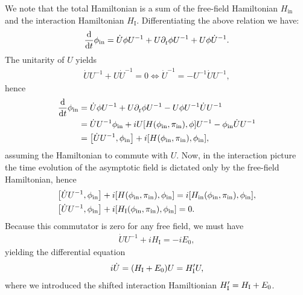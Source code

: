 We note that the total Hamiltonian is a sum of the free-field Hamiltonian $H_{\text{in}}$ and the interaction Hamiltonian $H_{\text{I}}$. Differentiating the above relation we have:
\begin{align*}
	\dv{t}\phi_{\text{in}} = \dot{U}\phi U^{-1} + U\partial^{}_{t}\phi U^{-1} + U\phi \dot{U}^{-1}.
\end{align*}
The unitarity of $U$ yields
\begin{align*}
	\dot{U}U^{-1} + U\dot{U}^{-1} = 0 \iff \dot{U}^{-1} = -U^{-1}\dot{U}U^{-1},
\end{align*}
hence
\begin{align*}
	\dv{t}\phi_{\text{in}} &= \dot{U}\phi U^{-1} + U\del{}{t}\phi U^{-1} - U\phi U^{-1}\dot{U}U^{-1} \\
	                       &= \dot{U}U^{-1}\phi_{\text{in}} + iU\comm{H(\phi_{\text{in}}, \pi_{\text{in}})}{\phi} U^{-1} - \phi_{\text{in}}\dot{U}U^{-1} \\
	                       &= \comm{\dot{U}U^{-1}}{\phi_{\text{in}}} + i\comm{H(\phi_{\text{in}}, \pi_{\text{in}})}{\phi_{\text{in}}},
\end{align*}
assuming the Hamiltonian to commute with $U$. Now, in the interaction picture the time evolution of the asymptotic field is dictated only by the free-field Hamiltonian, hence
\begin{align*}
	&\comm{\dot{U}U^{-1}}{\phi_{\text{in}}} + i\comm{H(\phi_{\text{in}}, \pi_{\text{in}})}{\phi_{\text{in}}} = i\comm{H_{\text{in}}(\phi_{\text{in}}, \pi_{\text{in}})}{\phi_{\text{in}}}, \\
	&\comm{\dot{U}U^{-1}}{\phi_{\text{in}}} + i\comm{H_{\text{I}}(\phi_{\text{in}}, \pi_{\text{in}})}{\phi_{\text{in}}} = 0.
\end{align*}
Because this commutator is zero for any free field, we must have
\begin{align*}
	\dot{U}U^{-1} + iH_{\text{I}} = -iE_{0},
\end{align*}
yielding the differential equation
\begin{align*}
	i\dot{U} = (H_{\text{I}} + E_{0})U = H_{\text{I}}^{\prime} U,
\end{align*}
where we introduced the shifted interaction Hamiltionian $H_{\text{I}}^{\prime} = H_{\text{I}} + E_{0}$.


